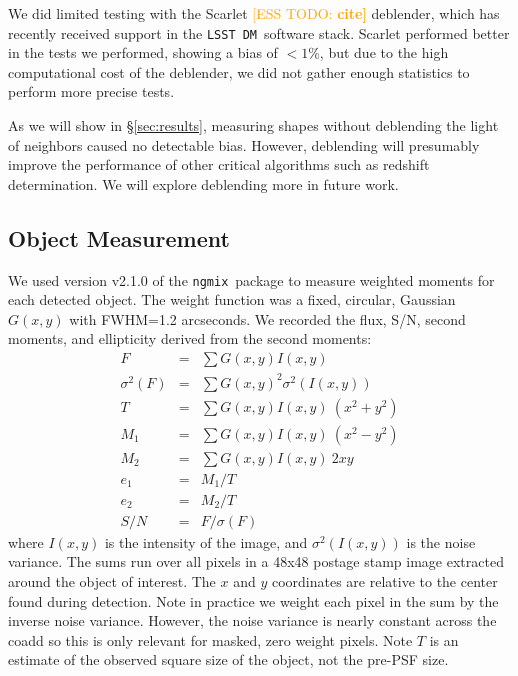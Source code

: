\documentclass[twocolumn,twocolappendix,astrosym]{openjournal}
\newcommand{\esstodo}[1]{\textcolor{orange}{[ESS TODO: \bf #1]}}
\newcommand{\ngmix}{\texttt{ngmix}}
\newcommand{\dm}{\texttt{LSST DM}}
\begin{document}
We did limited testing with the Scarlet \esstodo{cite} deblender, which has
recently received support in the \dm\ software stack. Scarlet performed better
in the tests we performed, showing a bias of $< 1$\%, but due to the high
computational cost of the deblender, we did not gather enough statistics to
perform more precise tests.

As we will show in \S \ref{sec:results}, measuring shapes without deblending
the light of neighbors caused no detectable bias.  However, deblending will
presumably improve the performance of other critical algorithms such as
redshift determination.  We will explore deblending more in future work.

\subsection{Object Measurement} \label{sec:mdet:meas}

We used version v2.1.0 of the \ngmix\ package to measure weighted moments for
each detected object. The weight function was a fixed, circular, Gaussian $G(x,
y)$ with FWHM=1.2 arcseconds.  We recorded the flux,
S/N, second moments, and ellipticity derived from the second moments:
\begin{eqnarray} \label{eq:moments}
    F &=& \sum G(x, y) I(x, y) \nonumber \\
    \sigma^2(F) &=& \sum G(x, y)^2 \sigma^2(I(x, y)) \nonumber \\
    T &=& \sum G(x, y) I(x, y) ~ (x^2 + y^2) \nonumber \\
    M_1 &=& \sum G(x, y) I(x, y) ~ (x^2 - y^2) \\
    M_2 &=& \sum G(x, y) I(x, y) ~ 2 x y \nonumber \\
    e_1 &=& M_1 / T \nonumber \\
    e_2 &=& M_2 / T \nonumber \\
    S/N &=& F / \sigma(F) \nonumber
\end{eqnarray}
where $I(x, y)$ is the intensity of the image, and $\sigma^2(I(x, y))$ is the
noise variance. The sums run over all pixels in a 48x48 postage stamp image
extracted around the object of interest.  The $x$ and $y$ coordinates are
relative to the center found during detection.  Note in practice we weight each
pixel in the sum by the inverse noise variance. However, the noise variance is
nearly constant across the coadd so this is only relevant for masked, zero
weight pixels.  Note $T$ is an estimate of the observed square size of
the object, not the pre-PSF size.
\end{document}
